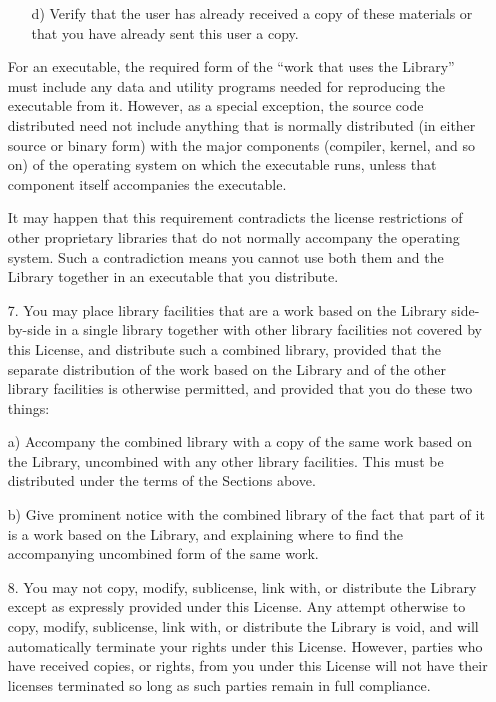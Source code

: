 \begin{multicols}{3}
\begin{itemize}
\begin{itemize}
   \item[d)] Verify that the user has already received a copy of these
     materials or that you have already sent this user a copy.
   \end{itemize}

   For an executable, the required form of the ``work that uses the Library''
   must include any data and utility programs needed for reproducing the
   executable from it.  However, as a special exception, the source code
   distributed need not include anything that is normally distributed (in
   either source or binary form) with the major components (compiler,
   kernel, and so on) of the operating system on which the executable runs,
   unless that component itself accompanies the executable.

   It may happen that this requirement contradicts the license restrictions
   of other proprietary libraries that do not normally accompany the
   operating system. Such a contradiction means you cannot use both them
   and the Library together in an executable that you distribute.
   
 \item[7.] You may place library facilities that are a work based on
   the Library side-by-side in a single library together with other
   library facilities not covered by this License, and distribute such
   a combined library, provided that the separate distribution of the
   work based on the Library and of the other library facilities is
   otherwise permitted, and provided that you do these two things:

      a) Accompany the combined library with a copy of the same work based
	 on the Library, uncombined with any other library facilities. This
	 must be distributed under the terms of the Sections above.

      b) Give prominent notice with the combined library of the fact that
	 part of it is a work based on the Library, and explaining where to
	 find the accompanying uncombined form of the same work.
         
       \item[8.] You may not copy, modify, sublicense, link with, or
         distribute the Library except as expressly provided under
         this License. Any attempt otherwise to copy, modify,
         sublicense, link with, or distribute the Library is void, and
         will automatically terminate your rights under this License.
         However, parties who have received copies, or rights, from
         you under this License will not have their licenses
         terminated so long as such parties remain in full compliance.
         

\end{itemize}
\end{multicols}
